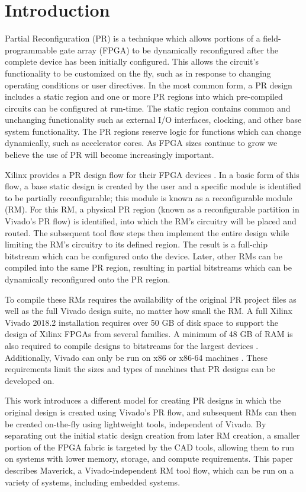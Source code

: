 \section{Introduction}
\label{sec:introduction}

Partial Reconfiguration (PR) is a technique which allows portions of a field-programmable gate array (FPGA) to be dynamically reconfigured after the complete device has been initially configured.
This allows the circuit's functionality to be customized on the fly, such as in response to changing operating conditions or user directives.
In the most common form, a PR design includes a static region and one or more PR regions into which pre-compiled circuits can be configured at run-time.
The static region contains common and unchanging functionality such as external I/O interfaces, clocking, and other base system functionality.
The PR regions reserve logic for functions which can change dynamically, such as accelerator cores.
As FPGA sizes continue to grow we believe the use of PR will become increasingly important.

Xilinx provides a PR design flow for their FPGA devices \cite{Xilinx:2018d}.
In a basic form of this flow, a base static design is created by the user and a specific module is identified to be partially reconfigurable; this module is known as a reconfigurable module (RM). 
For this RM, a physical PR region (known as a reconfigurable partition in Vivado's PR flow) is identified, into which the RM's circuitry will be placed and routed.
The subsequent tool flow steps then implement the entire design while limiting the RM's circuitry to its defined region.
The result is a full-chip bitstream which can be configured onto the device. 
Later, other RMs can be compiled into the same PR region, resulting in partial bitstreams which can be dynamically reconfigured onto the PR region.

To compile these RMs requires the availability of the original PR project files as well as the full Vivado design suite, no matter how small the RM.
A full Xilinx Vivado 2018.2 installation requires over 50 GB of disk space to support the design of Xilinx FPGAs from several families.
A minimum of 48 GB of RAM is also required to compile designs to bitstreams for the largest devices \cite{Xilinx:2018}.
Additionally, Vivado can only be run on x86 or x86-64 machines \cite{Xilinx:2018b}.
These requirements limit the sizes and types of machines that PR designs can be developed on.

This work introduces a different model for creating PR designs in which the original design is created using Vivado’s PR flow, and subsequent RMs can then be created on-the-fly using lightweight tools, independent of Vivado.
By separating out the initial static design creation from later RM creation, a smaller portion of the FPGA fabric is targeted by the CAD tools, allowing them to run on systems with lower memory, storage, and compute requirements.
This paper describes Maverick, a Vivado-independent RM tool flow, which can be run on a variety of systems, including embedded systems.

